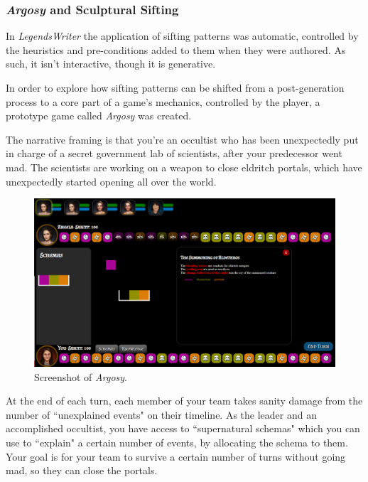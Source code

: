 \subsubsection{\textit{Argosy} and Sculptural Sifting}\label{subsubsec:argosy-and-sculptural-sifting}

In \textit{LegendsWriter} the application of sifting patterns was automatic, controlled by the heuristics and pre-conditions added to them when they were authored. As such, it isn't interactive, though it is generative.

In order to explore how sifting patterns can be shifted from a post-generation process to a core part of a game's mechanics, controlled by the player, a prototype game called \textit{Argosy} was created. 

The narrative framing is that you're an occultist who has been unexpectedly put in charge of a secret government lab of scientists, after your predecessor went mad. The scientists are working on a weapon to close eldritch portals, which have unexpectedly started opening all over the world. 


\begin{figure}
    \centering
    \includegraphics[width=\textwidth]{figures/4-Delve/argosy.png}
    \caption{Screenshot of \textit{Argosy}.}
    \label{fig:argosy}
\end{figure}


At the end of each turn, each member of your team takes sanity damage from the number of ``unexplained events" on their timeline. As the leader and an accomplished occultist, you have access to ``supernatural schemas" which you can use to ``explain" a certain number of events, by allocating the schema to them. Your goal is for your team to survive a certain number of turns without going mad, so they can close the portals.

